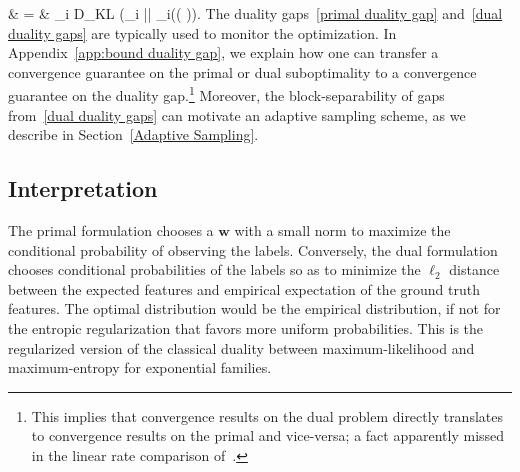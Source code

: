 & = & \sum_i D_{KL} (\alpha_i || \hat{ \alpha}_i(( \balpha)).
\eeqa
The duality gaps~\eqref{primal duality gap}  and~\eqref{dual duality gaps} are typically used to monitor the optimization.
In Appendix~\ref{app:bound duality gap}, we explain how one can transfer a convergence guarantee on the primal or dual suboptimality to a convergence guarantee on the duality gap.\footnote{
	This implies that convergence results on the dual problem directly translates to convergence results on the primal and vice-versa;
	a fact apparently missed in the linear rate comparison of~\citet{schmidt2015non}.
}
Moreover, the block-separability of gaps from~\eqref{dual duality gaps} can motivate an adaptive sampling scheme, as we describe in Section~\ref{Adaptive Sampling}.

\subsection{Interpretation}
The primal formulation chooses a $\bm{w}$ with a small norm to maximize the conditional probability of observing the labels.
Conversely, the dual formulation chooses conditional probabilities of the labels so as to minimize the $\ell_2$ distance between the expected features and empirical expectation of the ground truth features.
The optimal distribution would be the empirical distribution, if not for the entropic regularization that favors more uniform probabilities.
This is the regularized version of the classical duality between maximum-likelihood and maximum-entropy for exponential families.

